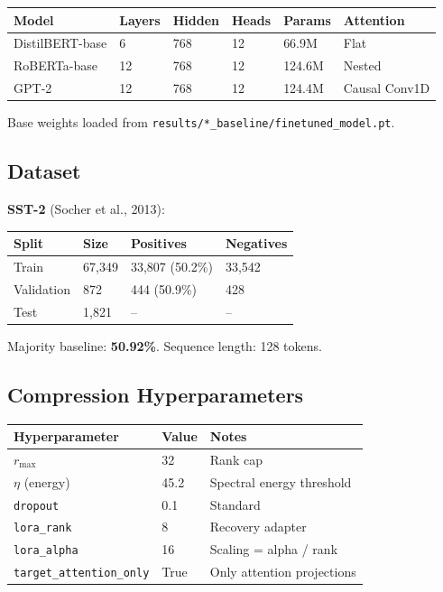 \begin{table}[H]
\centering
\small
\begin{tabular}{llllll}
\toprule
\textbf{Model} & \textbf{Layers} & \textbf{Hidden} & \textbf{Heads} & \textbf{Params} & \textbf{Attention} \\
\midrule
DistilBERT-base & 6 & 768 & 12 & 66.9M & Flat \\
RoBERTa-base & 12 & 768 & 12 & 124.6M & Nested \\
GPT-2 & 12 & 768 & 12 & 124.4M & Causal Conv1D \\
\bottomrule
\end{tabular}
\end{table}

Base weights loaded from \texttt{results/*\_baseline/finetuned\_model.pt}.

\subsection{Dataset}

\textbf{SST-2} (Socher et al., 2013):

\begin{table}[H]
\centering
\small
\begin{tabular}{llll}
\toprule
\textbf{Split} & \textbf{Size} & \textbf{Positives} & \textbf{Negatives} \\
\midrule
Train & 67,349 & 33,807 (50.2\%) & 33,542 \\
Validation & 872 & 444 (50.9\%) & 428 \\
Test & 1,821 & -- & -- \\
\bottomrule
\end{tabular}
\end{table}

Majority baseline: \textbf{50.92\%}. Sequence length: 128 tokens.

\subsection{Compression Hyperparameters}

\begin{table}[H]
\centering
\small
\begin{tabular}{lll}
\toprule
\textbf{Hyperparameter} & \textbf{Value} & \textbf{Notes} \\
\midrule
$r_\text{max}$ & 32 & Rank cap \\
$\eta$ (energy) & 45.2 & Spectral energy threshold \\
\texttt{dropout} & 0.1 & Standard \\
\texttt{lora\_rank} & 8 & Recovery adapter \\
\texttt{lora\_alpha} & 16 & Scaling = alpha / rank \\
\texttt{target\_attention\_only} & True & Only attention projections \\
\bottomrule
\end{tabular}
\end{table}

